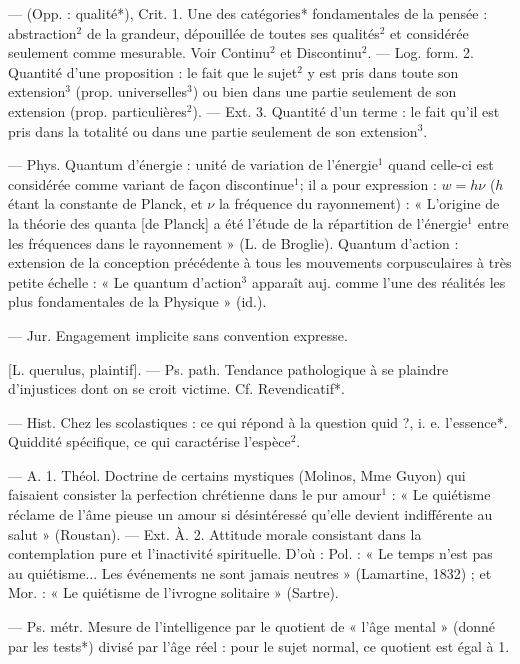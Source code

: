 \begin{itemize}[leftmargin=1cm, label=, itemsep=1pt]
 — (Opp. : qualité*), Crit.
1. Une des catégories* fondamentales de la pensée : abstraction$^2$ de
la grandeur, dépouillée de toutes
ses qualités$^2$ et considérée seulement
comme mesurable. Voir Continu$^2$ et
Discontinu$^2$. — Log. form. 2. Quantité d'une proposition : le fait que le
sujet$^2$ y est pris dans toute son
extension$^3$ (prop. universelles$^3$) ou
bien dans une partie seulement de
son extension (prop. particulières$^2$).
— Ext. 3. Quantité d'un terme : le
fait qu'il est pris dans la totalité ou
dans une partie seulement de son
extension$^3$.

 — Phys. Quantum d'énergie :
unité de variation de l'énergie$^1$
quand celle-ci est considérée comme
variant de façon discontinue$^1$; il a
pour expression : $ w = h \nu $ ($h$ étant
la constante de Planck, et $\nu$ la fréquence du rayonnement) : « L’origine de la théorie des quanta [de
Planck] a été l'étude de la répartition de l’énergie$^1$ entre les fréquences
dans le rayonnement » (L. de Broglie). Quantum d’action : extension
de la conception précédente à tous
les mouvements corpusculaires à
très petite échelle : « Le quantum
d'action$^3$ apparaît auj. comme l’une
des réalités les plus fondamentales
de la Physique » (id.).

 — Jur. Engagement
implicite sans convention expresse.

 [L. querulus, plaintif].
— Ps. path. Tendance pathologique à se plaindre d’injustices dont
on se croit victime. Cf. Revendicatif*.

 — Hist. Chez les scolastiques :
ce qui répond à la question quid ?,
i. e. l’essence*. Quiddité spécifique,
ce qui caractérise l’espèce$^2$.

 — A. 1. Théol. Doctrine
de certains mystiques (Molinos,
Mme Guyon) qui faisaient consister
la perfection chrétienne dans le pur
amour$^1$ : « Le quiétisme réclame de
l'âme pieuse un amour si désintéressé qu'elle devient indifférente
au salut » (Roustan). — Ext. À. 2.
Attitude morale consistant dans la
contemplation pure et l'inactivité
spirituelle. D’où : Pol. : « Le temps
n'est pas au quiétisme... Les événements ne sont jamais neutres »
(Lamartine, 1832) ; et Mor. : « Le
quiétisme de l’ivrogne solitaire »
(Sartre).

 — Ps. métr.
Mesure de l'intelligence par le quotient de « l’âge mental » (donné par
les tests*) divisé par l’âge réel : pour
le sujet normal, ce quotient est
égal à 1.


\end{itemize}
